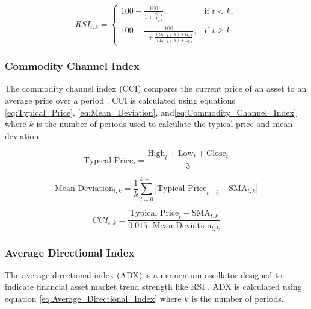 \documentclass[journal]{new-aiaa}
\begin{document}
\begin{equation}\label{eq:Relative_Strength_Index}
        RSI_{t,k} = 
        \begin{cases} 
                100 - \frac{100}{1 + \frac{G_{t,k}}{L_{t,k}}}, & \text{if } t < k, \\[10pt]
                100 - \frac{100}{1 + \frac{(G_{t-1,k} \cdot k) + G_{t,k}}{(L_{t-1,k} \cdot k) + L_{t,k}}}, & \text{if } t \geq k.
        \end{cases}
\end{equation}

\subsubsection{Commodity Channel Index}\label{sec:Technical_Analysis:Commodity_Channel_Index}
The commodity channel index (CCI) compares the current price of an asset to an average price over a period \cite{lambert1983commodity}.
CCI is calculated using equations \ref{eq:Typical_Price}, \ref{eq:Mean_Deviation}, and\ref{eq:Commodity_Channel_Index} where $k$ is the number of periods used to calculate the typical price and mean deviation.

\begin{equation}\label{eq:Typical_Price}
        \text{Typical Price}_t = \frac{\text{High}_{t} + \text{Low}_{t} + \text{Close}_{t}}{3}
\end{equation}

\begin{equation}\label{eq:Mean_Deviation}
        \text{Mean Deviation}_{t,k} = \frac{1}{k} \sum_{i=0}^{k-1} \left|\text{Typical Price}_{t-i} - \text{SMA}_{t,k}\right|
\end{equation}

\begin{equation}\label{eq:Commodity_Channel_Index}
        CCI_{t,k} =  \frac{\text{Typical Price}_t - \text{SMA}_{t,k}}{0.015 \cdot \text{Mean Deviation}_{t,k}}
\end{equation}

\subsubsection{Average Directional Index}\label{sec:Technical_Analysis:Average_Directional_Index}
The average directional index (ADX) is a momentum oscillator designed to indicate financial asset market trend strength like RSI \cite{wilder1978new}.
ADX is calculated using equation \ref{eq:Average_Directional_Index} where $k$ is the number of periods.
\end{document}
